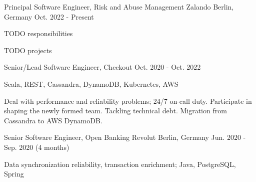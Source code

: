 

\begin{cventries}

  \cventry
    {Principal Software Engineer, Risk and Abuse Management} %
    {Zalando} %
    {Berlin, Germany} %
    {Oct. 2022 - Present} %
    {
      \begin{cvitems} %
        \item {TODO responsibilities}
        \item {TODO projects}
      \end{cvitems}
    }

  \cventry
    {Senior/Lead Software Engineer, Checkout} %
    {} %
    {} %
    {Oct. 2020 - Oct. 2022} %
    {
      \begin{cvitems} %
        \item {Scala, REST, Cassandra, DynamoDB, Kubernetes, AWS}
        \item {Deal with performance and reliability problems; 24/7 on-call duty. Participate in shaping the newly formed team. Tackling technical debt. Migration from Cassandra to AWS DynamoDB.}
      \end{cvitems}
    }

  \cventry
    {Senior Software Engineer, Open Banking} %
    {Revolut} %
    {Berlin, Germany} %
    {Jun. 2020 - Sep. 2020 (4 months)} %
    {
      \begin{cvitems} %
        \item {Data synchronization reliability, transaction enrichment; Java, PostgreSQL, Spring}
      \end{cvitems}
    }


\end{cventries}
